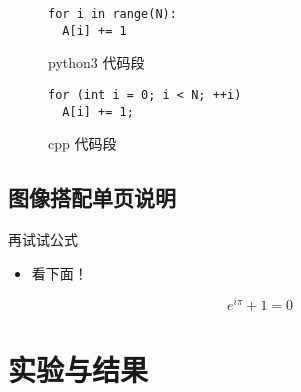\documentclass[
    fontset=fandol,
    xcolor=x11names %
]{ctexbeamer}
\begin{document}
\begin{frame}[fragile] %

\begin{minipage}{.49\linewidth}

\begin{figure}
\begin{verbatim}
for i in range(N):
  A[i] += 1
\end{verbatim}
\caption{python3 代码段}
\end{figure}

\end{minipage}\begin{minipage}{.49\linewidth}

\begin{figure}
\begin{verbatim}
for (int i = 0; i < N; ++i)
  A[i] += 1;
\end{verbatim}
\caption{cpp 代码段}
\end{figure}

\end{minipage}
    
\end{frame}

\subsection{图像搭配单页说明}

\begin{frame}

    \begin{block}{再试试公式}
        \begin{itemize}
            \item 看下面！
        \end{itemize}
    \end{block}

    \begin{equation}
        e^{i\pi}+1=0
    \end{equation}

\end{frame}

\section{实验与结果}
\end{document}
